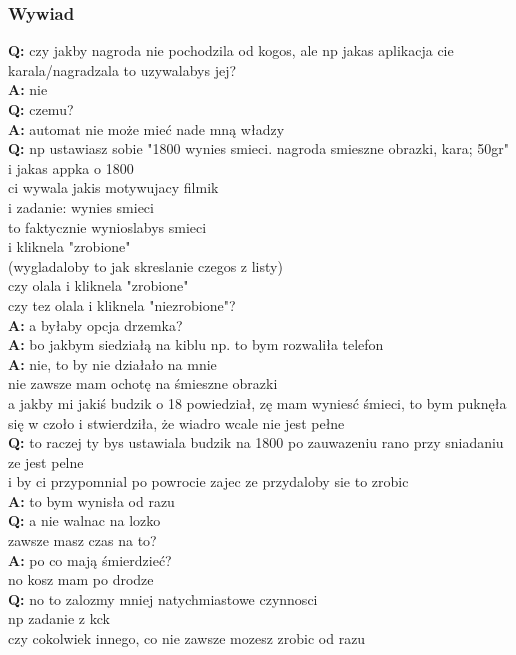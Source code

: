 \documentclass[11pt,wide]{mwart}
\newcommand{\w}[1]{
    \indent\textbf{#1}
 }
\begin{document}
\subsubsection{Wywiad}
\begin{multicols}{2}
\noindent \w{Q:}czy jakby nagroda nie pochodzila od kogos, ale np jakas aplikacja cie karala/nagradzala
to uzywalabys jej?\\
\w{A:}nie\\
\w{Q:}czemu?\\
\w{A:}automat nie może mieć nade mną władzy\\
\w{Q:}np ustawiasz sobie "1800 wynies smieci. nagroda smieszne obrazki, kara; 50gr"\\
i jakas appka o 1800\\
ci wywala jakis motywujacy filmik\\
i zadanie: wynies smieci\\
to faktycznie wynioslabys smieci\\
i kliknela "zrobione"\\
(wygladaloby to jak skreslanie czegos z listy)\\
czy olala i kliknela "zrobione"\\
czy tez olala i kliknela "niezrobione"?\\
\w{A:}a byłaby opcja drzemka?\\
\w{A:}bo jakbym siedziałą na kiblu np. to bym rozwaliła telefon\\
\w{A:}nie, to by nie działało na mnie\\
nie zawsze mam ochotę na śmieszne obrazki\\
a jakby mi jakiś budzik o 18 powiedział, zę mam wyniesć śmieci, to bym puknęła się w czoło i stwierdziła, że wiadro wcale nie jest pełne\\
\w{Q:}to raczej ty bys ustawiala budzik na 1800 po zauwazeniu rano przy sniadaniu ze jest pelne\\
i by ci przypomnial po powrocie zajec ze przydaloby sie to zrobic\\
\w{A:}to bym wynisła od razu\\
\w{Q:}a nie walnac na lozko\\
zawsze masz czas na to?\\
\w{A:}po co mają śmierdzieć?\\
no kosz mam po drodze\\
\w{Q:}no to zalozmy mniej natychmiastowe czynnosci\\
np zadanie z kck\\
czy cokolwiek innego, co nie zawsze mozesz zrobic od razu\\

\end{multicols}
\end{document}
